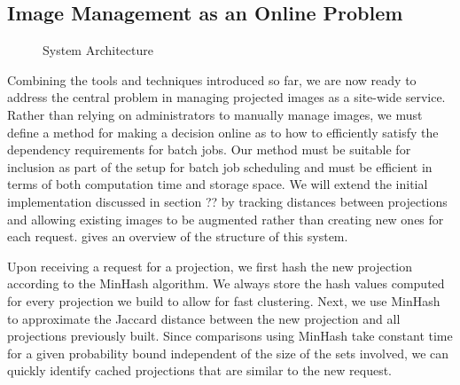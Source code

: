 \documentclass[conference]{IEEEtran}
\begin{document}
\subsection{Image Management as an Online Problem}

\begin{figure}[t]
\centering
{}
\caption{System Architecture}
\label{figure:sys-arch}
\end{figure}

Combining the tools and techniques introduced so far,
we are now ready to address the central problem in managing projected images as a site-wide service.
Rather than relying on administrators to manually manage images,
we must define a method for making a decision online as to how to efficiently satisfy the dependency requirements for batch jobs.
Our method must be suitable for inclusion as part of the setup for batch job scheduling and must be efficient in terms of both computation time and storage space.
We will extend the initial implementation discussed in section ?? by tracking distances between projections and allowing existing images to be augmented rather than creating new ones for each request.
 gives an overview of the structure of this system.

Upon receiving a request for a projection,
we first hash the new projection according to the MinHash algorithm.
We always store the hash values computed for every projection we build to allow for fast clustering.
Next, we use MinHash to approximate the Jaccard distance between the new projection and all projections previously built.
Since comparisons using MinHash take constant time for a given probability bound independent of the size of the sets involved,
we can quickly identify cached projections that are similar to the new request.
\end{document}
